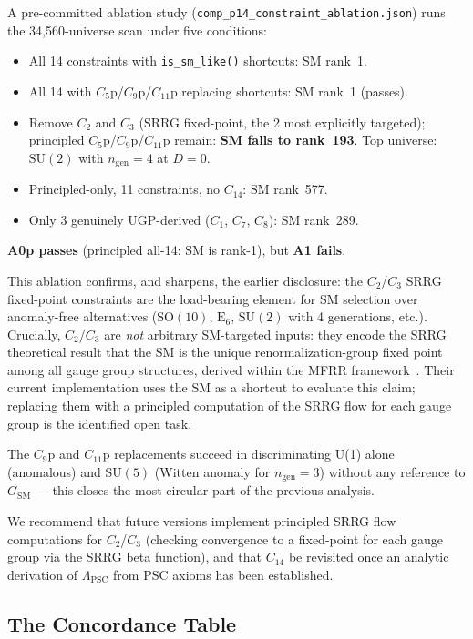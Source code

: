 \documentclass[11pt,twocolumn]{article}
\theoremstyle{remark}
\begin{document}
A pre-committed ablation study (\texttt{comp\_p14\_constraint\_ablation.json})
runs the 34,560-universe scan under five conditions:
\begin{itemize}
  \item[A0 (legacy):] All 14 constraints with \texttt{is\_sm\_like()} shortcuts: SM rank~1.
  \item[A0p (principled):] All 14 with $C_5$p/$C_9$p/$C_{11}$p replacing shortcuts: SM rank~1 (passes).
  \item[A1:] Remove $C_2$ and $C_3$ (SRRG fixed-point, the 2 most explicitly targeted);
    principled $C_5$p/$C_9$p/$C_{11}$p remain: \textbf{SM falls to rank~193}.
    Top universe: $\mathrm{SU}(2)$ with $n_{\mathrm{gen}}=4$ at $D=0$.
  \item[A2:] Principled-only, 11 constraints, no $C_{14}$: SM rank~577.
  \item[A3:] Only 3 genuinely UGP-derived ($C_1$, $C_7$, $C_8$): SM rank~289.
\end{itemize}

\textbf{A0p passes} (principled all-14: SM is rank-1), but \textbf{A1 fails}.

This ablation confirms, and sharpens, the earlier disclosure: the $C_2$/$C_3$
SRRG fixed-point constraints are the load-bearing element for SM selection over
anomaly-free alternatives ($\mathrm{SO}(10)$, $\mathrm{E}_6$, $\mathrm{SU}(2)$
with 4 generations, etc.).  Crucially, $C_2$/$C_3$ are \emph{not} arbitrary
SM-targeted inputs: they encode the SRRG theoretical result that the SM is the
unique renormalization-group fixed point among all gauge group structures, derived
within the MFRR framework~\cite{SpivackPSCOpt}.  Their current implementation
uses the SM as a shortcut to evaluate this claim; replacing them with a principled
computation of the SRRG flow for each gauge group is the identified open task.

The $C_9$p and $C_{11}$p replacements succeed in discriminating U(1) alone
(anomalous) and $\mathrm{SU}(5)$ (Witten anomaly for $n_{\mathrm{gen}}=3$)
without any reference to $G_{\mathrm{SM}}$ — this closes the most circular
part of the previous analysis.

We recommend that future versions implement principled SRRG flow computations
for $C_2$/$C_3$ (checking convergence to a fixed-point for each gauge group via
the SRRG beta function), and that $C_{14}$ be revisited once an analytic
derivation of $\Lambda_{\mathrm{PSC}}$ from PSC axioms has been established.

\subsection{The Concordance Table}
\label{sec:table}
\end{document}
